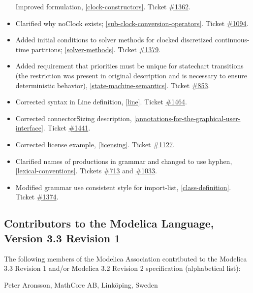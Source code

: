 \documentclass[10pt,a4paper]{report}
\def\doublelabel#1{\label{#1}}
\begin{document}
\begin{itemize}
  Improved formulation, \ref{clock-constructors}. Ticket
  \href{https://trac.modelica.org/Modelica/ticket/1362}{\#1362}.
\item
  Clarified why noClock exists; \ref{sub-clock-conversion-operators}. Ticket
  \href{https://trac.modelica.org/Modelica/ticket/1094}{\#1094}.
\item
  Added initial conditions to solver methods for clocked discretized
  continuous-time partitions; \ref{solver-methods}. Ticket
  \href{https://trac.modelica.org/Modelica/ticket/1379}{\#1379}.
\item
  Added requirement that priorities must be unique for statechart
  transitions (the restriction was present in original description and
  is necessary to ensure deterministic behavior), \ref{state-machine-semantics}. Ticket
  \href{https://trac.modelica.org/Modelica/ticket/853}{\#853}.
\item
  Corrected syntax in Line definition, \ref{line}. Ticket
  \href{https://trac.modelica.org/Modelica/ticket/1464}{\#1464}.
\item
  Corrected connectorSizing description, \ref{annotations-for-the-graphical-user-interface}. Ticket
  \href{https://trac.modelica.org/Modelica/ticket/1441}{\#1441}.
\item
  Corrected license example, \ref{licensing}. Ticket
  \href{https://trac.modelica.org/Modelica/ticket/1127}{\#1127}.
\item
  Clarified names of productions in grammar and changed to use hyphen,
  \ref{lexical-conventions}. Tickets
  \href{https://trac.modelica.org/Modelica/ticket/713}{\#713} and
  \href{https://trac.modelica.org/Modelica/ticket/1033}{\#1033}.
\item
  Modified grammar use consistent style for import-list, \ref{class-definition}.
  Ticket \href{https://trac.modelica.org/Modelica/ticket/1374}{\#1374}.
\end{itemize}

\subsection{Contributors to the Modelica Language, Version 3.3 Revision 1}\doublelabel{contributors-to-the-modelica-language-version-3-3-revision-1}

The following members of the Modelica Association contributed to the
Modelica 3.3 Revision 1 and/or Modelica 3.2 Revision 2 specification
(alphabetical list):

Peter Aronsson, MathCore AB, Linköping, Sweden
\end{document}
